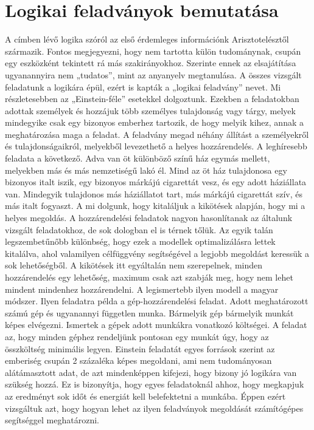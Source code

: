 \documentclass[12pt,a4paper,twoside, openright]{report}
\begin{document}
    \section{Logikai feladványok bemutatása} 
		A címben lévő logika szóról az első érdemleges információnk Arisztotelésztől származik. Fontos megjegyezni, hogy nem tartotta külön tudománynak, csupán egy eszközként tekintett rá más szakirányokhoz. Szerinte ennek az elsajátítása ugyanannyira nem „tudatos”, mint az anyanyelv megtanulása.\cite{logic}
		A összes vizsgált feladatunk a logikára épül, ezért is kapták a „logikai feladvány” nevet. Mi részletesebben az „Einstein-féle” esetekkel\cite{logicpuzzles} dolgoztunk. Ezekben a feladatokban adottak személyek és hozzájuk több személyes tulajdonság vagy tárgy, melyek mindegyike csak egy bizonyos emberhez tartozik, de hogy melyik kihez, annak a meghatározása maga a feladat. A feladvány megad néhány állítást a személyekről és tulajdonságaikról, melyekből levezethető a helyes hozzárendelés.
		A leghíresebb feladata a következő. Adva van öt különböző színű ház egymás mellett, melyekben más és más nemzetiségű lakó él. Mind az öt ház tulajdonosa egy bizonyos italt iszik, egy bizonyos márkájú cigarettát vesz, és egy adott háziállata van. Mindegyik tulajdonos más háziállatot tart, más márkájú cigarettát szív, és más italt fogyaszt. A mi dolgunk, hogy kitaláljuk a kikötések alapján, hogy mi a helyes megoldás. 
		A hozzárendelési feladatok nagyon hasonlítanak az általunk vizsgált feladatokhoz, de sok dologban el is térnek tőlük. Az egyik talán legszembetűnőbb különbség, hogy ezek a modellek optimalizálásra lettek kitalálva, ahol valamilyen célfüggvény segítségével a legjobb megoldást keressük a sok lehetőségből. A kikötések itt egyáltalán nem szerepelnek, minden hozzárendelés egy lehetőség, maximum csak azt szabják meg, hogy nem lehet mindent mindenhez hozzárendelni. A legismertebb ilyen modell a magyar módszer\cite{magyarmodszer}.
		Ilyen feladatra példa a gép-hozzárendelési feladat. Adott meghatározott számú gép és ugyanannyi független munka. Bármelyik gép bármelyik munkát képes elvégezni. Ismertek a gépek adott munkákra vonatkozó költségei. A feladat az, hogy minden géphez rendeljünk pontosan egy munkát úgy, hogy az összköltség minimális legyen. 
		Einstein feladatát egyes források szerint az emberiség csupán 2 százaléka képes megoldani, ami nem tudományosan alátámasztott adat, de azt mindenképpen kifejezi, hogy bizony jó logikára van szükség hozzá. Ez is bizonyítja, hogy egyes feladatoknál ahhoz, hogy megkapjuk az eredményt sok időt és energiát kell belefektetni a munkába. Éppen ezért vizsgáltuk azt, hogy hogyan lehet az ilyen feladványok megoldását számítógépes segítséggel meghatározni.
		
\end{document}
